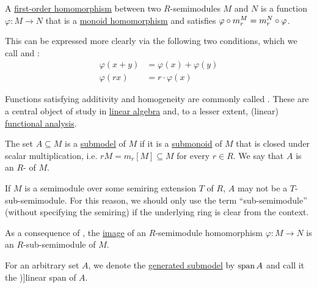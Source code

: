 \begin{definition}
\begin{thmenum}[resume=def:semimodule]
     A \hyperref[def:first_order_homomorphism]{first-order homomorphism} between two \( R \)-semimodules \( M \) and \( N \) is a function \( \varphi: M \to N \) that is a \hyperref[def:monoid/homomorphism]{monoid homomorphism} and satisfies \( \varphi \bincirc m_r^M = m_r^N \bincirc \varphi \).

    This can be expressed more clearly via the following two conditions, which we call  and :
    \begin{subequations}
      \begin{align}
        \varphi(x + y) &= \varphi(x) + \varphi(y) \label{eq:def:semimodule/homomorphism/additive} \\
           \varphi(rx) &= r \cdot \varphi(x) \label{eq:def:semimodule/homomorphism/homogeneity}
      \end{align}
    \end{subequations}

    Functions satisfying additivity and homogeneity are commonly called . These are a central object of study in \hyperref[sec:linear_algebra]{linear algebra} and, to a lesser extent, (linear) \hyperref[sec:functional_analysis]{functional analysis}.

     The set \( A \subseteq M \) is a \hyperref[def:first_order_submodel]{submodel} of \( M \) if it is a \hyperref[def:monoid/submodel]{submonoid} of \( M \) that is closed under scalar multiplication, i.e. \( rM = m_r[M] \subseteq M \) for every \( r \in R \). We say that \( A \) is an \( R \)- of \( M \).

    If \( M \) is a semimodule over some semiring extension \( T \) of \( R \), \( A \) may not be a \( T \)-sub-semimodule. For this reason, we should only use the term \enquote{sub-semimodule} (without specifying the semiring) if the underlying ring is clear from the context.

    As a consequence of , the \hyperref[def:set_valued_map/image]{image} of an \( R \)-semimodule homomorphism \( \varphi: M \to N \) is an \( R \)-sub-semimodule of \( M \).

     For an arbitrary set \( A \), we denote the \hyperref[def:first_order_generated_substructure]{generated submodel} by \( \operatorname{span}{ A } \) and call it the \term[ru=линейная оболочка (\cite[sec. 3.2]{Тыртышников2007})]{linear span} of \( A \).


\end{thmenum}
\end{definition}

